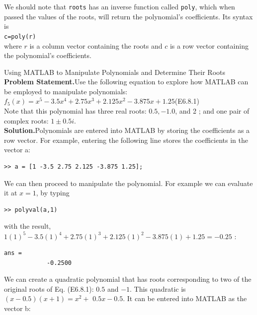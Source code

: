 \documentclass[../main.tex]{subfiles}
\begin{document}
We should note that \texttt{roots} has an inverse function called \texttt{poly}, which when passed the values of the roots, will return the polynomial's coefficients. Its syntax is\\

\texttt{c=poly(r)}\\

\noindent where $r$ is a column vector containing the roots and $c$ is a row vector containing the polynomial's coefficients.
\newpage

\begin{example} Using MATLAB to Manipulate Polynomials and Determine Their Roots\\

    \noindent\textbf{Problem Statement.}\quad Use the following equation to explore how MATLAB can be employed to manipulate polynomials:\\

    $f_{5}(x)=x^{5}-3.5 x^{4}+2.75 x^{3}+2.125 x^{2}-3.875 x+1.25$\hfill (E6.8.1)\\

    \noindent Note that this polynomial has three real roots: $0.5,-1.0$, and 2 ; and one pair of complex roots: $1 \pm 0.5 i$.\\


    \noindent\textbf{Solution.}\quad Polynomials are entered into MATLAB by storing the coefficients as a row vector. For example, entering the following line stores the coefficients in the vector a:\\

    \begin{lstlisting}[numbers=none,frame=none]
        >> a = [1 -3.5 2.75 2.125 -3.875 1.25];
	\end{lstlisting}

    \noindent We can then proceed to manipulate the polynomial. For example we can evaluate it at $x=1$, by typing
    
    \begin{lstlisting}[numbers=none,frame=none]
        >> polyval(a,1)
	\end{lstlisting}
 
    \noindent with the result, $1(1)^{5}-3.5(1)^{4}+2.75(1)^{3}+2.125(1)^{2}-3.875(1)+1.25=-0.25$ :

    \begin{lstlisting}[numbers=none,frame=none]
        ans =
            -0.2500
	\end{lstlisting}

    We can create a quadratic polynomial that has roots corresponding to two of the original roots of Eq. (E6.8.1): $0.5$ and $-1$. This quadratic is $(x-0.5)(x+1)=x^{2}+$ $0.5 x-0.5$. It can be entered into MATLAB as the vector b:


\end{example}
\end{document}

